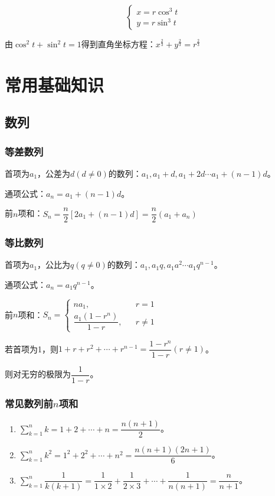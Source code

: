 \documentclass[UTF8, 12pt]{ctexart}
\begin{document}
$$
    \left\{
    \begin{array}{lcl}
        x=r\cos^3t \\
        y=r\sin^3t
    \end{array}
    \right.
$$

由$\cos^2t+\sin^2t=1$得到直角坐标方程：$x^{\frac{2}{3}}+y^{\frac{2}{3}}=r^{\frac{2}{3}}$

\section{常用基础知识}
\subsection{数列}
\subsubsection{等差数列}

首项为$a_1$，公差为$d(d\neq 0)$的数列：$a_1,a_1+d,a_1+2d\cdots a_1+(n-1)d$。

通项公式：$a_n=a_1+(n-1)d$。

前$n$项和：$S_n=\dfrac{n}{2}[2a_1+(n-1)d]=\dfrac{n}{2}(a_1+a_n)$

\subsubsection{等比数列}

首项为$a_1$，公比为$q(q\neq 0)$的数列：$a_1,a_1q,a_1a^2\cdots a_1q^{n-1}$。

通项公式：$a_n=a_1q^{n-1}$。

前$n$项和：$S_n=
    \left\{
    \begin{array}{lcl}
        na_1,                   &  & r=1     \\
        \dfrac{a_1(1-r^n)}{1-r}, &  & r\neq 1
    \end{array}
    \right.$

若首项为1，则$1+r+r^2+\cdots+r^{n-1}=\dfrac{1-r^n}{1-r}(r\neq 1)$。

则对无穷的极限为$\dfrac{1}{1-r}$。

\subsubsection{常见数列前$n$项和}

\begin{enumerate}
    \item $\sum_{k=1}^nk=1+2+\cdots+n=\dfrac{n(n+1)}{2}$。
    \item $\sum_{k=1}^nk^2=1^2+2^2+\cdots+n^2=\dfrac{n(n+1)(2n+1)}{6}$。
    \item $\sum_{k=1}^n\dfrac{1}{k(k+1)}=\dfrac{1}{1\times 2}+\dfrac{1}{2\times 3}+\cdots+\dfrac{1}{n(n+1)}=\dfrac{n}{n+1}$。
\end{enumerate}
\end{document}
